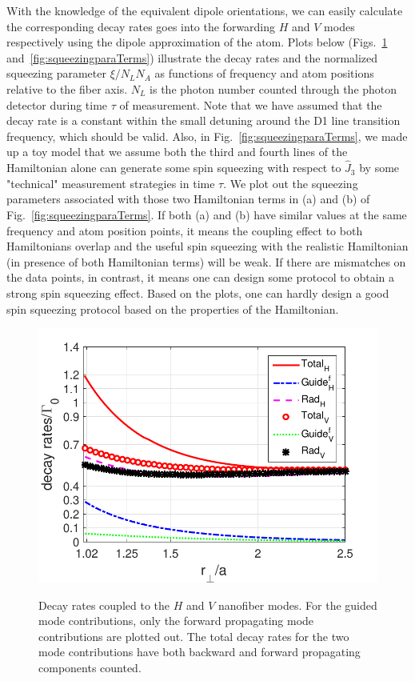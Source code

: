 With the knowledge of the equivalent dipole orientations, we can easily calculate the corresponding decay rates goes into the forwarding $ H $ and $ V $ modes respectively using the dipole approximation of the atom. Plots below (Figs.~\ref{fig:HVdecayrates} and~\ref{fig:squeezingparaTerms}) illustrate the decay rates and the normalized squeezing parameter $ \xi/N_LN_A $ as functions of frequency and atom positions relative to the fiber axis. $ N_L $ is the photon number counted through the photon detector during time $ \tau $ of measurement. Note that we have assumed that the decay rate is a constant within the small detuning around the D1 line transition frequency, which should be valid. Also, in Fig.~\ref{fig:squeezingparaTerms}, we made up a toy model that we assume both the third and fourth lines of the Hamiltonian alone can generate some spin squeezing with respect to $ \hat{J}_3 $ by some "technical" measurement strategies in time $ \tau $. We plot out the squeezing parameters associated with those two Hamiltonian terms in (a) and (b) of Fig.~\ref{fig:squeezingparaTerms}. If both (a) and (b) have similar values at the same frequency and atom position points, it means the coupling effect to both Hamiltonians overlap and the useful spin squeezing with the realistic Hamiltonian (in presence of both Hamiltonian terms) will be weak. If there are mismatches on the data points, in contrast, it means one can design some protocol to obtain a strong spin squeezing effect. Based on the plots, one can hardly design a good spin squeezing protocol based on the properties of the Hamiltonian. 

\begin{figure}[!tbp]
\begin{minipage}{.91\linewidth}
\centering
{\includegraphics[scale=0.75]{../media/Figs/HVdecayrates}}
\end{minipage}
\caption[Decay rates coupled to the $ H $ and $ V $ nanofiber modes with a scalar polarizability of atoms.]{Decay rates coupled to the $ H $ and $ V $ nanofiber modes. For the guided mode contributions, only the forward propagating mode contributions are plotted out. The total decay rates for the two mode contributions have both backward and forward propagating components counted.}\label{fig:HVdecayrates}
\end{figure}

